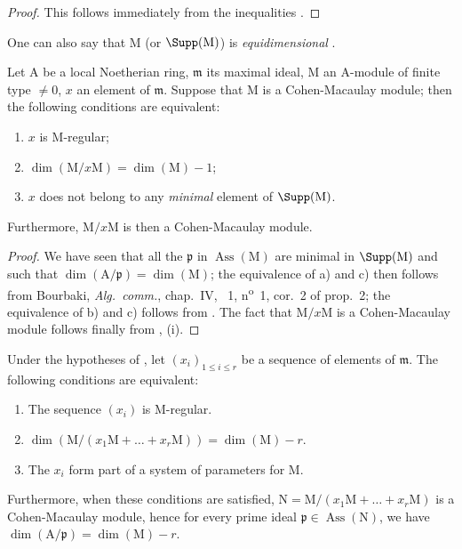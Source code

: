 \begin{proof}
This follows immediately from the inequalities .
\end{proof}

One can also say that $\mathrm{M}$ (or $\Supp(\mathrm{M})$) is \emph{equidimensional} .

\begin{proposition}[16.5.5]
\label{0.16.5.5}
Let $\mathrm{A}$ be a local Noetherian ring, $\mathfrak{m}$ its maximal ideal, $\mathrm{M}$ an $\mathrm{A}$-module of finite type $\neq 0$, $x$ an element of $\mathfrak{m}$.
Suppose that $\mathrm{M}$ is a Cohen-Macaulay module; then the following conditions are equivalent:
\begin{enumerate}
  \item[a)] $x$ is $\mathrm{M}$-regular;
  \item[b)] $\dim(\mathrm{M}/x\mathrm{M})=\dim(\mathrm{M})-1$;
  \item[c)] $x$ does not belong to any \emph{minimal} element of $\Supp(\mathrm{M})$.
\end{enumerate}
Furthermore, $\mathrm{M}/x\mathrm{M}$ is then a Cohen-Macaulay module.
\end{proposition}

\begin{proof}
We have seen  that all the $\mathfrak{p}$ in $\operatorname{Ass}(\mathrm{M})$ are minimal in $\Supp(\mathrm{M})$ and such that $\dim(\mathrm{A}/\mathfrak{p})=\dim(\mathrm{M})$; the equivalence of a) and c) then follows from Bourbaki, \emph{Alg.~comm.}, chap.~IV, \textsection~1, n\textsuperscript{o}~1, cor.~2 of prop.~2; the equivalence of b) and c) follows from .
The fact that $\mathrm{M}/x\mathrm{M}$ is a Cohen-Macaulay module follows finally from , (i).
\end{proof}

\begin{corollary}[16.5.6]
\label{0.16.5.6}
Under the hypotheses of , let $(x_i)_{1\leq i\leq r}$ be a sequence of elements of $\mathfrak{m}$.
The following conditions are equivalent:
\begin{enumerate}
  \item[a)] The sequence $(x_i)$ is $\mathrm{M}$-regular.
  \item[b)] $\dim(\mathrm{M}/(x_1\mathrm{M}+\ldots+x_r\mathrm{M}))=\dim(\mathrm{M})-r$.
  \item[c)] The $x_i$ form part of a system of parameters for $\mathrm{M}$.
\end{enumerate}
Furthermore, when these conditions are satisfied, $\mathrm{N}=\mathrm{M}/(x_1\mathrm{M}+\ldots+x_r\mathrm{M})$ is a Cohen-Macaulay module, hence for every prime ideal $\mathfrak{p}\in\operatorname{Ass}(\mathrm{N})$, we have $\dim(\mathrm{A}/\mathfrak{p})=\dim(\mathrm{M})-r$.
\end{corollary}


